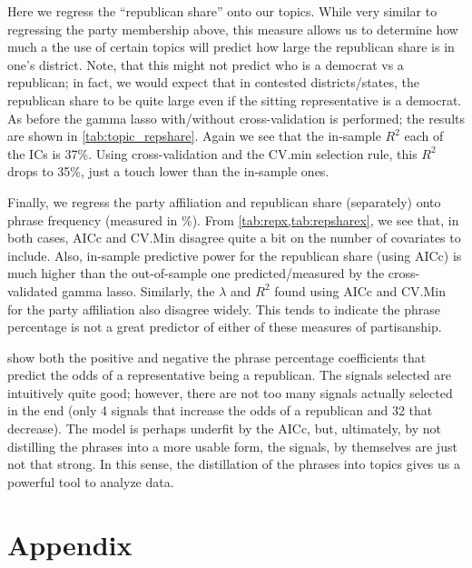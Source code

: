 \documentclass[11pt, fleqn]{article}
\begin{document}


Here we regress the ``republican share'' onto our topics.  While very similar to regressing the party membership above, this measure allows us to determine how much a the use of certain topics will predict how large the republican share is in one's district.  Note, that this might not predict who is a democrat vs a republican; in fact, we would expect that in contested districts/states, the republican share to be quite large even if the sitting representative is a democrat.  As before the gamma lasso with/without cross-validation is performed; the results are shown in \vref{tab:topic_repshare}.  Again we see that the in-sample $R^2$ each of the ICs is 37\%.  Using cross-validation and the CV.min selection rule, this $R^2$ drops to 35\%, just a touch lower than the in-sample ones.



Finally, we regress the party affiliation and republican share (separately) onto phrase frequency (measured in \%).  From \vref{tab:repx,tab:repsharex}, we see that, in both cases, AICc and CV.Min disagree quite a bit on the number of covariates to include.  Also, in-sample predictive power for the republican share (using AICc) is much higher than the out-of-sample one predicted/measured by the cross-validated gamma lasso.  Similarly, the $\lambda$ and $R^2$ found using AICc and CV.Min for the party affiliation also disagree widely.  This tends to indicate the phrase percentage is not a great predictor of either of these measures of partisanship. 




 show both the positive and negative the phrase percentage coefficients that predict the odds of a representative being a republican.  The signals selected are intuitively quite good; however, there are not too many signals actually selected in the end (only 4 signals that increase the odds of a republican and 32 that decrease).  The model is perhaps underfit by the AICc, but, ultimately, by not distilling the phrases into a more usable form, the signals, by themselves are just not that strong.  In this sense, the distillation of the phrases into topics gives us a powerful tool to analyze data.





\clearpage
\section{Appendix}
\end{document}
